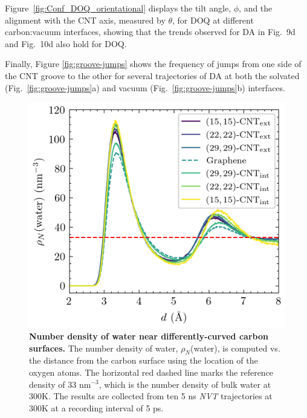 \documentclass[journal=jpcbfk, layout=twocolumn, manuscript=article]{achemso}
\begin{document}
Figure~\ref{fig:Conf_DOQ_orientational} displays the tilt angle, $\phi$, and the alignment with the CNT axis, measured by $\theta$, for DOQ at different carbon:vacuum interfaces, showing that the trends observed for DA in Fig.~9d and Fig.~10d also hold for DOQ.

Finally, Figure \ref{fig:groove-jumps} shows the frequency of jumps from one side of the CNT groove to the other for several trajectories of DA at both the solvated (Fig.~\ref{fig:groove-jumps}a) and vacuum (Fig.~\ref{fig:groove-jumps}b) interfaces.

\begin{figure}[!h]
    \centering
    \includegraphics[width=.35\textwidth]{Appendices/402_WaterO_num_density_armchair.png}
    \caption[Number Density of Water near Differently-curved Carbon Surfaces.]{\textbf{Number density of water near differently-curved carbon surfaces.}  The number density of water, $\rho_N$(water), is computed vs. the distance from the carbon surface using the location of the oxygen atoms. The horizontal red dashed line marks the reference density of 33 nm$^{-3}$, which is the number density of bulk water at 300K. The results are collected from ten 5 ns \textit{NVT} trajectories at 300K at a recording interval of 5 ps.
    }
    \label{fig:Conf_vertical_water}
\end{figure}
\end{document}
